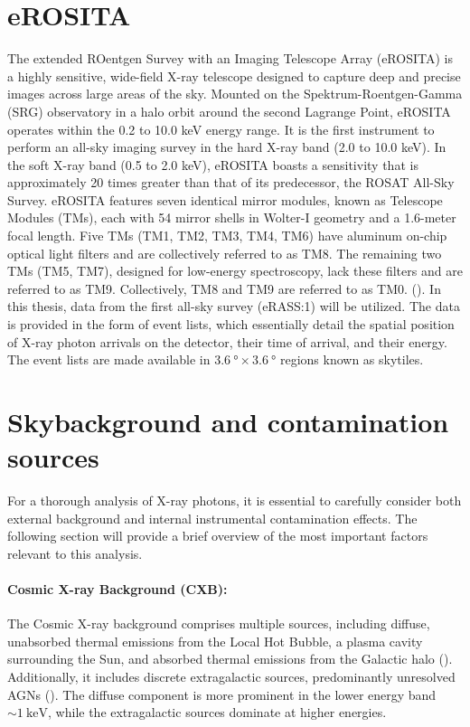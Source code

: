 \section{eROSITA}
The extended ROentgen Survey with an Imaging Telescope Array (eROSITA) is a highly sensitive, wide-field X-ray telescope designed to capture deep and precise images across large areas of the sky. Mounted on the Spektrum-Roentgen-Gamma (SRG) observatory in a halo orbit around the second Lagrange Point, eROSITA operates within the 0.2 to 10.0 keV energy range. It is the first instrument to perform an all-sky imaging survey in the hard X-ray band (2.0 to 10.0 keV). In the soft X-ray band (0.5 to 2.0 keV), eROSITA boasts a sensitivity that is approximately 20 times greater than that of its predecessor, the ROSAT All-Sky Survey. eROSITA features seven identical mirror modules, known as Telescope Modules (TMs), each with 54 mirror shells in Wolter-I geometry and a 1.6-meter focal length. Five TMs (TM1, TM2, TM3, TM4, TM6) have aluminum on-chip optical light filters and are collectively referred to as TM8. The remaining two TMs (TM5, TM7), designed for low-energy spectroscopy, lack these filters and are referred to as TM9. Collectively, TM8 and TM9 are referred to as TM0. (\cite{Predehl2021}). In this thesis, data from the first all-sky survey (eRASS:1) will be utilized. The data is provided in the form of event lists, which essentially detail the spatial position of X-ray photon arrivals on the detector, their time of arrival, and their energy. The event lists are made available in \(\SI{3.6}{\degree}\times\SI{3.6}{\degree}\) regions known as skytiles.
\section{Skybackground and contamination sources}\label{sec:background}
For a thorough analysis of X-ray photons, it is essential to carefully consider both external background and internal instrumental contamination effects. The following section will provide a brief overview of the most important factors relevant to this analysis.
\paragraph*{Cosmic X-ray Background (CXB):} The Cosmic X-ray background comprises multiple sources, including diffuse, unabsorbed thermal emissions from the Local Hot Bubble, a plasma cavity surrounding the Sun, and absorbed thermal emissions from the Galactic halo (\cite{galeazzi2006xmm}). Additionally, it includes discrete extragalactic sources, predominantly unresolved AGNs  (\cite{brandt2005deep}). The diffuse component is more prominent in the lower energy band \(\sim\SI{1}{\kilo\electronvolt}\), while the extragalactic sources dominate at higher energies.
